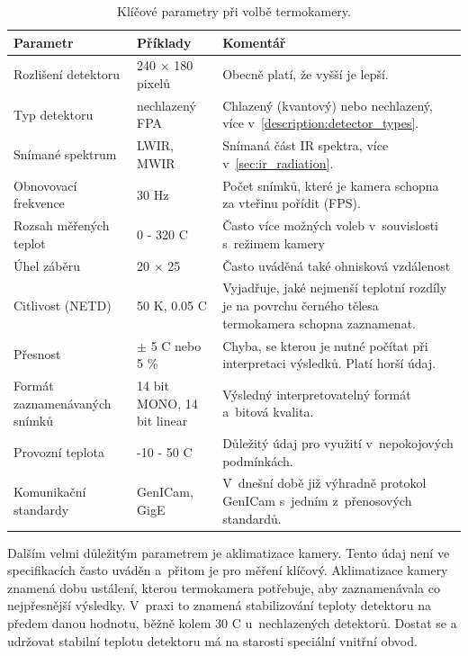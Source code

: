 \begin{table}[h]
	\centering
    \begin{tabular}{|p{4.5cm}|p{3cm}|p{6cm}|}
      \hline
      \rowcolor{Blue}
      \color{White}\textbf{Parametr} & \color{White}\textbf{Příklady} & \color{White}\textbf{Komentář}   \\ \hline
      Rozlišení detektoru & 240 $\times$ 180 pixelů &  Obecně platí, že vyšší je lepší. \\  \hline
      Typ detektoru & nechlazený FPA & Chlazený (kvantový) nebo nechlazený, více v~\ref{description:detector_types}.\\  \hline
      Snímané spektrum & LWIR, MWIR & Snímaná část IR spektra, více v~\ref{sec:ir_radiation}. \\ \hline
      Obnovovací frekvence & 30 Hz &  Počet snímků, které je kamera schopna za vteřinu pořídit (FPS). \\ \hline
      Rozsah měřených teplot & 0 - 320 \textdegree{}C & Často více možných voleb v~souvislosti s~režimem kamery \\ \hline
      Úhel záběru & 20\textdegree{} $\times$ 25\textdegree{} & Často uváděná také ohnisková vzdálenost \\ \hline
      Citlivost (NETD) & 50 K, 0.05 \textdegree{}C & Vyjadřuje, jaké nejmenší teplotní rozdíly je na povrchu černého tělesa termokamera schopna zaznamenat. \\ \hline
      Přesnost &  $\pm$ 5 \textdegree{}C nebo 5 \% & Chyba, se kterou je nutné počítat při interpretaci výsledků. Platí horší údaj. \\ \hline
      Formát zaznamenávaných snímků & 14 bit MONO, 14 bit linear  & Výsledný interpretovatelný formát a~bitová kvalita. \\ \hline
      Provozní teplota & -10 - 50 \textdegree{}C & Důležitý údaj pro využití v~nepokojových podmínkách.\\ \hline
      Komunikační standardy & GenICam, GigE &  V~dnešní době již výhradně protokol GenICam s~jedním z~přenosových standardů. \\  \hline
    \end{tabular}
    \caption{Klíčové parametry při volbě termokamery.}
    \label{table:thermal_camera_features}
\end{table}
    
    
    Dalším velmi důležitým parametrem je aklimatizace kamery. Tento údaj není ve specifikacích často uváděn a~přitom je pro měření klíčový. Aklimatizace kamery znamená dobu ustálení, kterou termokamera potřebuje, aby zaznamenávala co nejpřesnější výsledky. V~praxi to znamená stabilizování teploty detektoru na předem danou hodnotu, běžně kolem 30 \textdegree{}C u~nechlazených detektorů. Dostat se a udržovat stabilní teplotu detektoru má na starosti speciální vnitřní obvod. 

